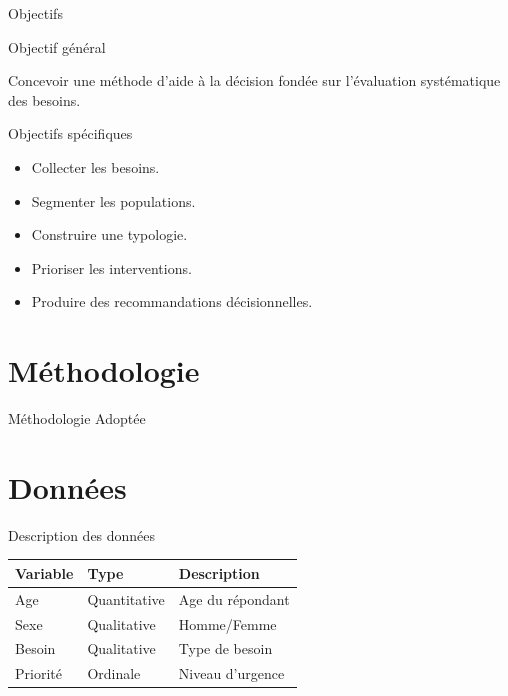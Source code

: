 \documentclass[aspectratio=169]{beamer}
\begin{document}
\begin{frame}{Objectifs}
	
	\begin{block}{Objectif général}
		
		Concevoir une méthode d'aide à la décision fondée sur
		l'évaluation systématique des besoins.
		
	\end{block}
	
	\vspace{0.3cm}
	
	\begin{block}{Objectifs spécifiques}
		
		\begin{itemize}
			\item Collecter les besoins.
			\item Segmenter les populations.
			\item Construire une typologie.
			\item Prioriser les interventions.
			\item Produire des recommandations décisionnelles.
		\end{itemize}
		
	\end{block}
	
\end{frame}

\section{Méthodologie}

\begin{frame}{Méthodologie Adoptée}
	
	\centering
	
	
	
\end{frame}

\section{Données}

\begin{frame}{Description des données}
	
	\begin{table}
		\centering
		\begin{tabular}{lll}
			\toprule
			Variable & Type & Description\\
			\midrule
			Age & Quantitative & Age du répondant\\
			Sexe & Qualitative & Homme/Femme\\
			Besoin & Qualitative & Type de besoin\\
			Priorité & Ordinale & Niveau d'urgence\\
			\bottomrule
		\end{tabular}
	\end{table}
	
\end{frame}
\end{document}
